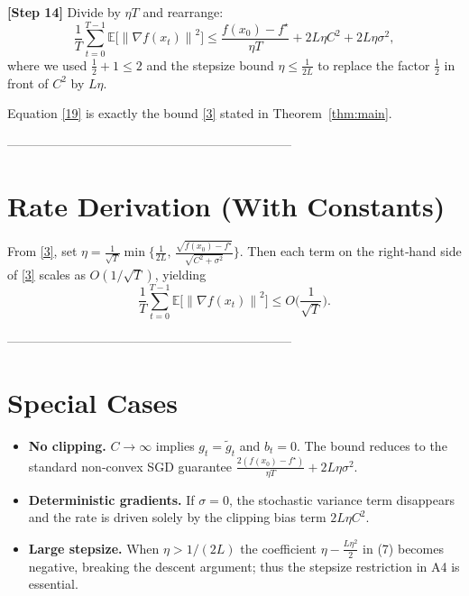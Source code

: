\documentclass{article}
\newcommand{\E}{\mathbb{E}}
\newcommand{\norm}[1]{\left\|#1\right\|}
\begin{document}
\noindent\textbf{[Step 14]} Divide by $\eta T$ and rearrange:
\[
\frac{1}{T}\sum_{t=0}^{T-1}\E\!\big[\norm{\nabla f(x_t)}^{2}\big]
\le
\frac{f(x_0)-f^{\star}}{\eta T}
+2L\eta C^{2}
+2L\eta\sigma^{2},
\tag{19}
\]
where we used $\frac12+\!1\le 2$ and the stepsize bound $\eta\le\frac{1}{2L}$ to replace
the factor $\frac{1}{2}$ in front of $C^{2}$ by $L\eta$.

Equation \eqref{19} is exactly the bound \eqref{3} stated in Theorem~\ref{thm:main}.
\hfill\qedsymbol

--------------------------------------------------------------------
\section*{Rate Derivation (With Constants)}
From \eqref{3}, set $\eta = \frac{1}{\sqrt{T}}\min\big\{\frac{1}{2L},\,\frac{\sqrt{f(x_0)-f^{\star}}}{\sqrt{C^{2}+\sigma^{2}}}\big\}$.
Then each term on the right‑hand side of \eqref{3} scales as $O(1/\sqrt{T})$, yielding
\[
\frac{1}{T}\sum_{t=0}^{T-1}\E\!\big[\norm{\nabla f(x_t)}^{2}\big]
\le
O\!\Big(\frac{1}{\sqrt{T}}\Big).
\]

--------------------------------------------------------------------
\section*{Special Cases}
\begin{itemize}
\item \textbf{No clipping.} $C\to\infty$ implies $g_t=\tilde g_t$ and $b_t=0$.
      The bound reduces to the standard non‑convex SGD guarantee
      $\frac{2(f(x_0)-f^{\star})}{\eta T}+2L\eta\sigma^{2}$.
\item \textbf{Deterministic gradients.} If $\sigma=0$, the stochastic variance term
      disappears and the rate is driven solely by the clipping bias term $2L\eta C^{2}$.
\item \textbf{Large stepsize.} When $\eta>1/(2L)$ the coefficient
      $\eta-\frac{L\eta^{2}}{2}$ in (7) becomes negative, breaking the descent
      argument; thus the stepsize restriction in A4 is essential.
\end{itemize}
\end{document}
